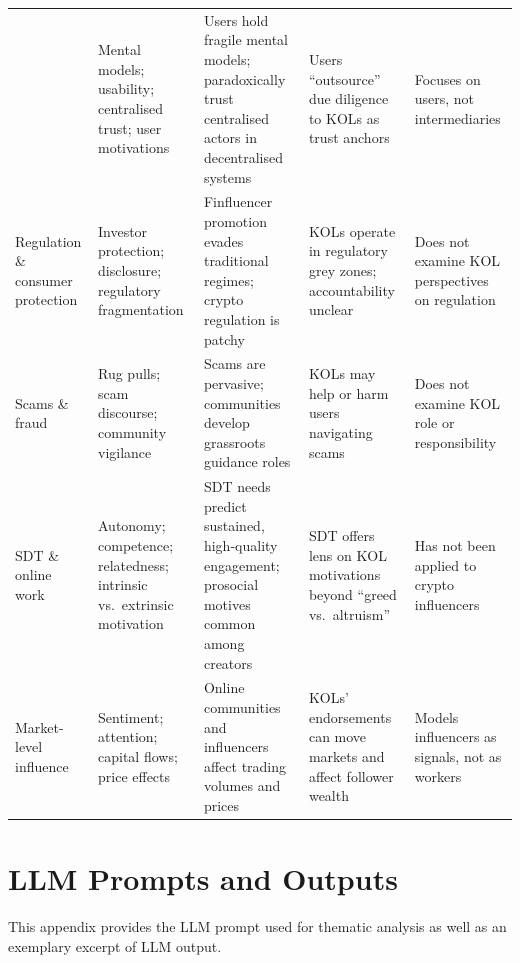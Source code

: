 \begin{table}[p]
\begin{tabular}{@{} p{3cm} p{3cm} p{3.8cm} p{3.6cm} p{3.5cm} @{}}
  & Mental models; usability; centralised trust; user motivations
  & Users hold fragile mental models; paradoxically trust centralised actors in decentralised systems
  & Users ``outsource'' due diligence to KOLs as trust anchors
  & Focuses on users, not intermediaries \\[6pt]
Regulation \& consumer protection \newline {\cite{StefanouFinfluencersReg2022,SECInvestorCrypto,FCA2023Finfluencer,ASAInfluencer2023}}
  & Investor protection; disclosure; regulatory fragmentation
  & Finfluencer promotion evades traditional regimes; crypto regulation is patchy
  & KOLs operate in regulatory grey zones; accountability unclear
  & Does not examine KOL perspectives on regulation \\[6pt]
Scams \& fraud \newline {\cite{OakScamReddit2025,Cernera2023rugpulls}}
  & Rug pulls; scam discourse; community vigilance
  & Scams are pervasive; communities develop grassroots guidance roles
  & KOLs may help or harm users navigating scams
  & Does not examine KOL role or responsibility \\[6pt]
SDT \& online work \newline {\cite{DeciRyan1985,RyanDeci2000,NovMotivatesWikipedians2007,TyackMeklerSDT2020,LiuAnxietyCommunities2021,torhonen2019}}
  & Autonomy; competence; relatedness; intrinsic vs.\ extrinsic motivation
  & SDT needs predict sustained, high-quality engagement; prosocial motives common among creators
  & SDT offers lens on KOL motivations beyond ``greed vs.\ altruism''
  & Has not been applied to crypto influencers \\[6pt]
Market-level influence \newline {\cite{LucchiniGamestopWSB2022,warkulat2024,pan2025,AnteMuskCrypto2023,Merkley2024}}
  & Sentiment; attention; capital flows; price effects
  & Online communities and influencers affect trading volumes and prices
  & KOLs' endorsements can move markets and affect follower wealth
  & Models influencers as signals, not as workers \\
\bottomrule
\end{tabular}
\end{table}


\section{LLM Prompts and Outputs}

This appendix provides the LLM prompt used for thematic analysis as well as an exemplary excerpt of LLM output.

